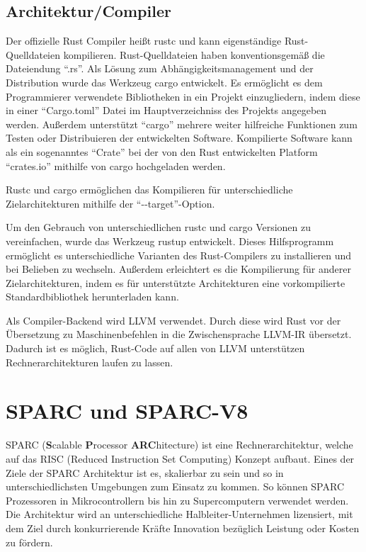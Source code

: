 \subsection{Architektur/Compiler}

Der offizielle Rust Compiler heißt rustc und kann eigenständige Rust-Quelldateien kompilieren. Rust-Quelldateien haben
konventionsgemäß die Dateiendung "`.rs"'. Als Lösung zum Abhängigkeitsmanagement und der Distribution wurde das Werkzeug cargo 
entwickelt. Es ermöglicht es dem Programmierer verwendete Bibliotheken in ein Projekt einzugliedern,
indem diese in einer "`Cargo.toml"' Datei im Hauptverzeichniss
des Projekts angegeben werden. Außerdem unterstützt "`cargo"' mehrere weiter hilfreiche Funktionen zum Testen oder
Distribuieren der entwickelten Software. Kompilierte Software kann als ein sogenanntes "`Crate"' bei der
von den Rust entwickelten Platform "`crates.io"' mithilfe von cargo hochgeladen werden.

Rustc und cargo ermöglichen das Kompilieren für unterschiedliche Zielarchitekturen mithilfe der "`-{}-target"'-Option.

Um den Gebrauch von unterschiedlichen rustc und cargo Versionen zu vereinfachen, wurde das Werkzeug rustup entwickelt. Dieses
Hilfsprogramm ermöglicht es unterschiedliche Varianten des Rust-Compilers zu installieren und bei Belieben zu wechseln.
Außerdem erleichtert es die Kompilierung für anderer Zielarchitekturen, indem es für unterstützte Architekturen eine
vorkompilierte Standardbibliothek herunterladen kann.

Als Compiler-Backend wird LLVM verwendet. Durch diese wird Rust vor der Übersetzung zu Maschinenbefehlen in die Zwischensprache
LLVM-IR übersetzt. Dadurch ist es möglich, Rust-Code auf allen von LLVM unterstützen Rechnerarchitekturen laufen zu lassen.


\section{SPARC und SPARC-V8}

SPARC (\textbf{S}calable \textbf{P}rocessor \textbf{ARC}hitecture) ist eine Rechnerarchitektur, welche auf das
RISC (Reduced Instruction Set Computing) Konzept aufbaut. Eines der Ziele der SPARC Architektur ist es, skalierbar
zu sein und so in unterschiedlichsten Umgebungen zum Einsatz zu kommen. So können SPARC Prozessoren in
Mikrocontrollern bis hin zu Supercomputern verwendet werden. Die Architektur wird an unterschiedliche
Halbleiter-Unternehmen lizensiert, mit dem Ziel durch konkurrierende Kräfte Innovation bezüglich Leistung oder
Kosten zu fördern.\cite{sparc}

